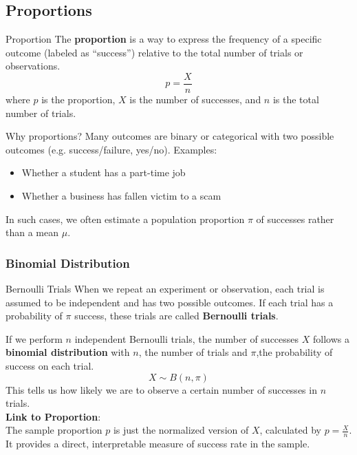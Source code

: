 \documentclass[9pt]{extarticle}
\begin{document}
\subsection{Proportions}
\vfill
\begin{definitionbox}{Proportion}{}
    The \textbf{proportion} is a way to express the frequency of a specific outcome (labeled as “success”) relative to the total number of trials or observations. 
    $$p = \frac{X}{n}$$
    where $p$ is the proportion, $X$ is the number of successes, and $n$ is the total number of trials.
\end{definitionbox}
\vfill
\begin{conceptbox}{Why proportions?}{}
    Many outcomes are binary or categorical with two possible outcomes (e.g. success/failure, yes/no). Examples:
    \begin{itemize}
        \item Whether a student has a part-time job
        \item Whether a business has fallen victim to a scam
    \end{itemize}
    In such cases, we often estimate a population proportion $\pi$ of successes rather than a mean $\mu$.
\end{conceptbox} 
\vfill 
\subsubsection{Binomial Distribution}
\begin{conceptbox}{Bernoulli Trials}{}
   When we repeat an experiment or observation, each trial is assumed to be independent and has two possible outcomes. If each trial has a probability of $\pi$ success, these trials are called \textbf{Bernoulli trials}.
\end{conceptbox}
\vfill
\noindent If we perform $n$ independent Bernoulli trials, the number of successes $X$ follows a \textbf{binomial distribution} with $n$, the number of trials and $\pi$,the probability of success on each trial.
$$X \sim B(n, \pi)$$
This tells us how likely we are to observe a certain number of successes in $n$ trials.\\[2ex]
\textbf{Link to Proportion}: \\
The sample proportion $p$ is just the normalized version of $X$, calculated by $p = \frac{X}{n}$. It provides a direct, interpretable measure of success rate in the sample.
\pagebreak
\end{document}
